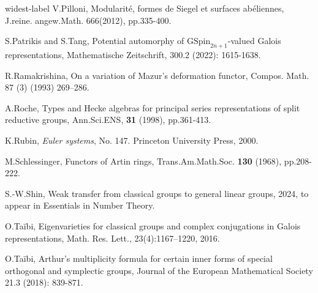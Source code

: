 \documentclass[12pt,oneside,reqno]{amsart}
\theoremstyle{plain}
\begin{document}
\begin{thebibliography}{widest-label}
		V.Pilloni,
		Modularit\'{e}, formes de Siegel et surfaces ab\'{e}liennes,
		J.reine. angew.Math.
		666(2012),
		pp.335-400.
		
		
		
		
		S.Patrikis and S.Tang,
		Potential automorphy of $\mathrm{GSpin}_{2n+1}$-valued Galois representations,
		Mathematische Zeitschrift, 300.2 (2022): 1615-1638.
		
		
		
		
		R.Ramakrishina,
		On a variation of Mazur’s deformation functor, Compos. Math. 87 (3) (1993) 269–286.
		
		
		
		
		A.Roche,
		Types and Hecke algebras for principal series
		representations of split
		reductive groups,
		Ann.Sci.ENS,
		\textbf{31}
		(1998),
		pp.361-413.
		
		
		
		
		K.Rubin,
		\textit{Euler systems},
		No. 147. Princeton University Press, 2000.
		
		
		
		
		M.Schlessinger,
		Functors of Artin rings,
		Trans.Am.Math.Soc.
		\textbf{130}
		(1968),
		pp.208-222.
		
		
		
		
		S.-W.Shin,
		Weak transfer from classical groups to general linear groups,
		2024, to appear in Essentials in Number Theory.
		
		
		
		
		
		
		
		O.Taïbi,
		Eigenvarieties for classical groups and complex conjugations in Galois representations,
		Math. Res. Lett., 23(4):1167–1220, 2016.
		
		
		
		O.Ta\"{i}bi,
		Arthur's multiplicity formula for certain inner forms of special orthogonal and symplectic groups,
		Journal of the European Mathematical Society 21.3 (2018): 839-871.
		
		
		
		
		

\end{thebibliography}
\end{document}
